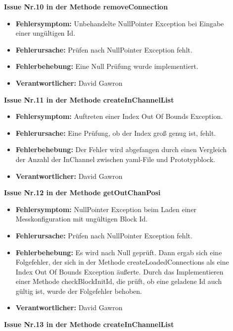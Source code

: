 \documentclass[parskip=full]{scrartcl}
\begin{document}
\begin{description}
\item []\textbf{Issue Nr.10 in der Methode removeConnection } 

\begin{itemize}
\item []\textbf{Fehlersymptom:} Unbehandelte NullPointer Exception bei Eingabe einer ungültigen Id.
\item []\textbf{Fehlerursache:} Prüfen nach NullPointer Exception fehlt.
\item []\textbf{Fehlerbehebung:} Eine Null Prüfung wurde implementiert.
\item []\textbf{Verantwortlicher:} David Gawron
\end{itemize}

\item []\textbf{Issue Nr.11 in der Methode createInChannelList } 

\begin{itemize}
\item []\textbf{Fehlersymptom:} Auftreten einer Index Out Of Bounds Exception.
\item []\textbf{Fehlerursache:} Eine Prüfung, ob der Index groß genug ist, fehlt.
\item []\textbf{Fehlerbehebung:} Der Fehler wird abgefangen durch einen Vergleich der Anzahl der InChannel zwischen yaml-File und Prototypblock.
\item []\textbf{Verantwortlicher:} David Gawron
\end{itemize}

\item []\textbf{Issue Nr.12 in der Methode getOutChanPosi } 

\begin{itemize}
\item []\textbf{Fehlersymptom:} NullPointer Exception beim Laden einer Messkonfiguration mit ungültigen Block Id.
\item []\textbf{Fehlerursache:} Prüfen nach NullPointer Exception fehlt.
\item []\textbf{Fehlerbehebung:} Es wird nach Null geprüft. Dann ergab sich eine Folgefehler, der sich in der Methode  createLoadedConnections als eine Index Out Of Bounds Exception äußerte. Durch das Implementieren einer Methode checkBlockInitId, die prüft, ob eine geladene Id auch gültig ist, wurde der Folgefehler behoben.
\item []\textbf{Verantwortlicher:} David Gawron
\end{itemize}


\item []\textbf{Issue Nr.13 in der Methode createInChannelList } 


\end{description}
\end{document}
